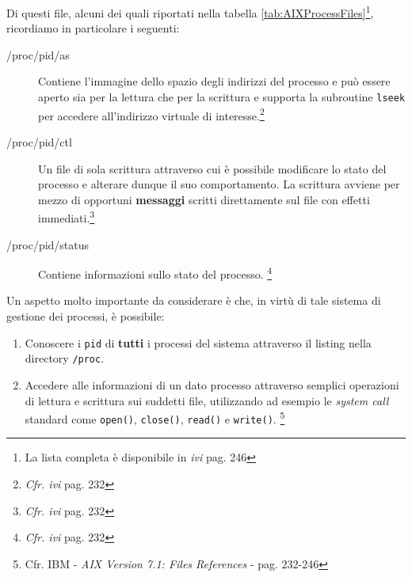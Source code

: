 \documentclass[10pt,a4paper, titlepage]{report}
\begin{document}
Di questi file, alcuni dei quali riportati nella tabella \ref{tab:AIXProcessFiles}\footnote{La lista completa è disponibile in \textit{ivi} pag. 246}, ricordiamo in particolare i seguenti: 

\begin{description}
\item[/proc/pid/as] Contiene l'immagine dello spazio degli indirizzi del processo e può essere aperto sia per la lettura che per la scrittura e supporta la subroutine \texttt{lseek} per accedere all'indirizzo virtuale di interesse.\footnote{\textit{Cfr. ivi} pag. 232}

\item[/proc/pid/ctl] Un file di sola scrittura attraverso cui è possibile modificare lo stato del processo e alterare dunque il suo comportamento. La scrittura avviene per mezzo di opportuni \textbf{messaggi} scritti direttamente sul file con effetti immediati.\footnote{\textit{Cfr. ivi} pag. 232}

\item[/proc/pid/status] Contiene informazioni sullo stato del processo. \footnote{\textit{Cfr. ivi} pag. 232}
\end{description}

Un aspetto molto importante da considerare è che, in virtù di tale sistema di gestione dei processi, è possibile: 

\begin{enumerate}
\item Conoscere i \texttt{pid} di \textbf{tutti} i processi del sistema attraverso il listing nella directory \texttt{/proc}.
\item Accedere alle informazioni di un dato processo attraverso semplici operazioni di lettura e scrittura sui suddetti file, utilizzando ad esempio le \textit{system call} standard come \texttt{open()}, \texttt{close()}, \texttt{read()} e \texttt{write()}. \footnote{Cfr. IBM - \textit{AIX Version 7.1: Files References} - pag. 232-246}
\end{enumerate}
\end{document}

